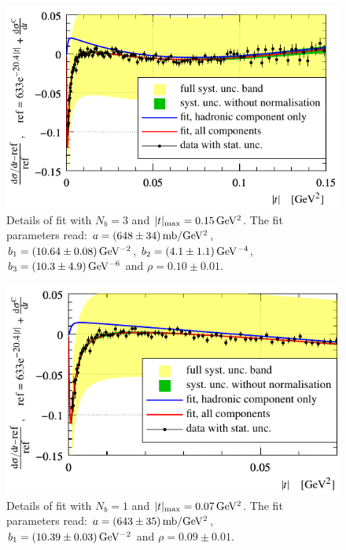 \begin{figure}
\vskip-5mm
\begin{center}
\includegraphics{fig/fit_details_exp3_0p15.pdf}
\vskip-2mm
\caption{%
Details of fit with $N_b = 3$ and $|t|_{\rm max} = 0.15\,{\rm GeV^2}$. The fit parameters read: $a = (648\pm 34)\,{\rm mb/GeV^2}$, $b_1 = (10.64 \pm 0.08)\,{\rm GeV^{-2}}$, $b_2 = (4.1 \pm 1.1)\,{\rm GeV^{-4}}$, $b_3 = (10.3 \pm 4.9)\,{\rm GeV^{-6}}$ and $\rho = 0.10 \pm 0.01$.
}
\label{fig:fit exp3 0.15}
\end{center}
\end{figure}


\begin{figure}
\vskip-5mm
\begin{center}
\includegraphics{fig/fit_details_exp1_0p07.pdf}
\vskip-2mm
\caption{%
Details of fit with $N_b = 1$ and $|t|_{\rm max} = 0.07\,{\rm GeV^2}$. The fit parameters read: $a = (643\pm 35)\,{\rm mb/GeV^2}$, $b_1 = (10.39 \pm 0.03)\,{\rm GeV^{-2}}$ and $\rho = 0.09 \pm 0.01$.
}
\label{fig:fit exp1 0.07}
\end{center}
\end{figure}

